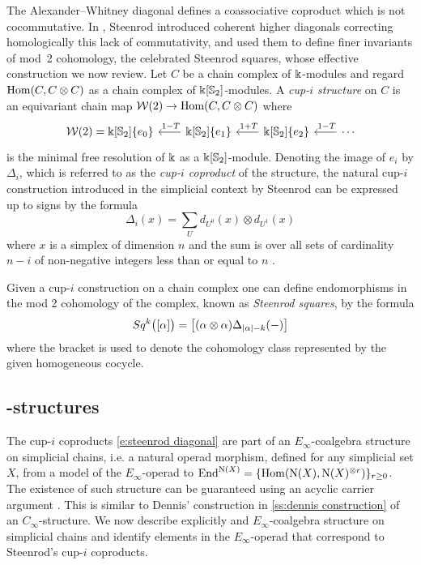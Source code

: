 The Alexander--Whitney diagonal defines a coassociative coproduct which is not cocommutative.
In \cite{steenrod1947products}, Steenrod introduced coherent higher diagonals correcting homologically this lack of commutativity, and used them to define finer invariants of mod~2 cohomology, the celebrated Steenrod squares, whose effective construction we now review.
Let $C$ be a chain complex of $\Bbbk$-modules and regard $\mathrm{Hom}(C, C \otimes C)$ as a chain complex of $\Bbbk[\mathbb{S}_2]$-modules.
A \textit{cup-$i$ structure} on $C$ is an equivariant chain map
$\mathcal{W}(2) \to \mathrm{Hom}(C, C \otimes C)$ where
\begin{equation} \label{e:minimal resolution r=2}
\begin{tikzcd} [column sep = .7cm]
\mathcal W(2) = \k[\Sym_2]\{e_0\} & \arrow[l, "\;1-T"'] \k[\Sym_2]\{e_1\} & \arrow[l, "\;1+T"'] \k[\Sym_2]\{e_2\} & \arrow[l, "\;1-T"'] \cdots
\end{tikzcd}
\end{equation}
is the minimal free resolution of $\Bbbk$ as a $\Bbbk[\mathbb{S}_2]$-module.
Denoting the image of $e_i$ by $\Delta_i$, which is referred to as the \textit{cup-$i$ coproduct} of the structure, the natural cup-$i$ construction introduced in the simplicial context by Steenrod can be expressed up to signs by the formula
\begin{equation} \label{e:steenrod diagonal}
\Delta_i(x) = \sum_U d_{U^0}(x) \otimes d_{U^1}(x)
\end{equation}
where $x$ is a simplex of dimension $n$ and the sum is over all sets of cardinality $n-i$ of non-negative integers less than or equal to $n$ \cite{medina2021newformulas}.

Given a cup-$i$ construction on a chain complex one can define endomorphisms in the mod 2 cohomology of the complex, known as \textit{Steenrod squares}, by the formula
\[
Sq^k \big( [\alpha] \big) = \big[ (\alpha \otimes \alpha) \Delta_{\lvert\alpha\rvert-k}(-) \big]
\]
where the bracket is used to denote the cohomology class represented by the given homogeneous cocycle.

\subsection{\pdfEinfty-structures}

The cup-$i$ coproducts \eqref{e:steenrod diagonal} are part of an $E_\infty$-coalgebra structure on simplicial chains, i.e. a natural operad morphism, defined for any simplicial set $X$, from a model of the $E_\infty$-operad to $\mathrm{End}^{\operatorname{N}(X)} = \{\mathrm{Hom}(\operatorname{N}(X), \operatorname{N}(X)^{\otimes r})\}_{r \geq 0}$.
The existence of such structure can be guaranteed using an acyclic carrier argument \cite{eilenberg1953acyclic}.
This is similar to Dennis' construction in \cref{ss:dennis construction} of an $C_\infty$-structure.
We now describe explicitly and $E_\infty$-coalgebra structure on simplicial chains and identify elements in the $E_\infty$-operad that correspond to Steenrod's cup-$i$ coproducts.

